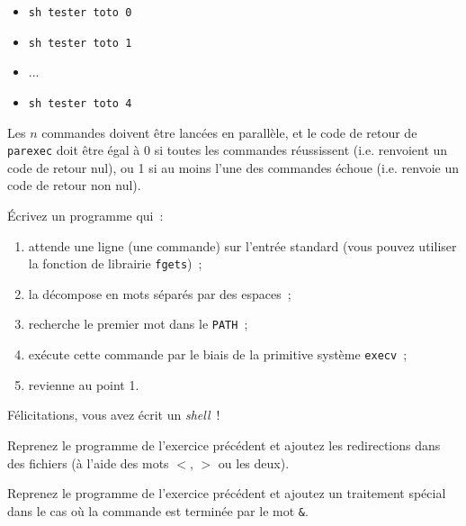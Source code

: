 \begin {itemize}
    \item \texttt {sh tester toto 0}
    \item \texttt {sh tester toto 1}
    \item ...
    \item \texttt {sh tester toto 4}
\end {itemize}

Les $n$ commandes doivent être lancées en parallèle, et le code de
retour de \texttt {parexec} doit être égal à 0 si toutes les commandes
réussissent (i.e. renvoient un code de retour nul), ou 1 si au moins
l'une des commandes échoue (i.e. renvoie un code de retour non nul).


\question

Écrivez un programme qui~:

\begin {enumerate}
    \item attende une ligne (une commande) sur l'entrée standard (vous
	pouvez utiliser la fonction de librairie {\tt fgets})~;

    \item la décompose en mots séparés par des espaces~;

    \item recherche le premier mot dans le {\tt PATH}~;

    \item exécute cette commande par le biais de la primitive système
	{\tt execv}~;
    
    \item revienne au point 1.

\end {enumerate}

Félicitations, vous avez écrit un {\em shell}~!


\question

Reprenez le programme de l'exercice précédent et ajoutez les
redirections dans des fichiers (à l'aide des mots $<$, $>$ ou les
deux).


\question
\label{q:minishell}

Reprenez le programme de l'exercice précédent et ajoutez un traitement
spécial dans le cas où la commande est terminée par le mot \verb:&:.

